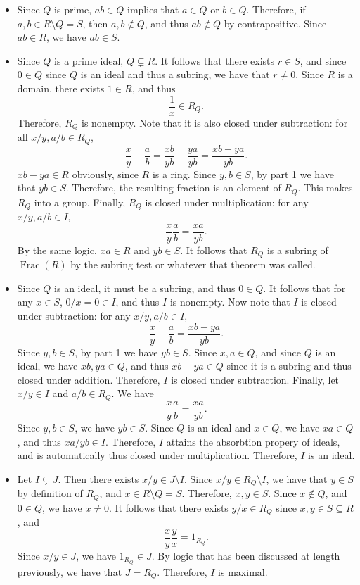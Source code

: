 \documentclass[11pt, letterpaper]{article}
\begin{document}
\begin{itemize}
	\item Since $Q$ is prime, $ab\in Q$ implies that $a\in Q$ or $b\in Q$. Therefore, if $a,b\in R\setminus Q=S$, then $a,b\notin Q$, and thus $ab\notin Q$ by contrapositive. Since $ab\in R$, we have $ab\in S$.
	\item Since $Q$ is a prime ideal, $Q\subsetneq R$. It follows that there exists $r\in S$, and since $0\in Q$ since $Q$ is an ideal and thus a subring, we have that $r\neq 0$. Since $R$ is a domain, there exists $1\in R$, and thus
		\[
			\frac{1}{x} \in R_Q
		.\]
		Therefore, $R_Q$ is nonempty. Note that it is also closed under subtraction: for all $x/y,a/b\in R_Q$,
		\[
			\frac{x}{y} -\frac{a}{b} =\frac{xb}{yb} -\frac{ya}{yb} =\frac{xb-ya}{yb} 
		.\]
		$xb-ya\in R$ obviously, since $R$ is a ring. Since $y,b\in S$, by part 1 we have that $yb\in S$. Therefore, the resulting fraction is an element of $R_Q$. This makes $R_Q$ into a group. Finally, $R_Q$ is closed under multiplication: for any $x/y,a/b\in I$,
		\[
			\frac{x}{y} \frac{a}{b} =\frac{xa}{yb} 
		.\]
		By the same logic, $xa\in R$ and $yb\in S$. It follows that $R_Q$ is a subring of $\operatorname{Frac} (R)$ by the subring test or whatever that theorem was called.
	\item Since $Q$ is an ideal, it must be a subring, and thus $0\in Q$. It follows that for any $x\in S$, $0/x=0\in I$, and thus $I$ is nonempty. Now note that $I$ is closed under subtraction: for any $x/y,a/b\in I$,
		\[
			\frac{x}{y} -\frac{a}{b}=\frac{xb-ya}{yb} 
		.\]
		Since $y,b\in S$, by part 1 we have $yb\in S$. Since $x,a\in Q$, and since $Q$ is an ideal, we have $xb,ya\in Q$, and thus $xb-ya\in Q$ since it is a subring and thus closed under addition. Therefore, $I$ is closed under subtraction. Finally, let $x/y\in I$ and $a/b\in R_Q$. We have
		\[
			\frac{x}{y} \frac{a}{b} =\frac{xa}{yb} 
		.\]
		Since $y,b\in S$, we have $yb\in S$. Since $Q$ is an ideal and $x\in Q$, we have $xa\in Q$, and thus $xa/yb\in I$. Therefore, $I$ attains the absorbtion propery of ideals, and is automatically thus closed under multiplication. Therefore, $I$ is an ideal.
	\item Let $I\subsetneq J$. Then there exists $ x/y\in J\setminus I$. Since $x/y\in R_Q\setminus I$, we have that $y\in S$ by definition of $R_Q$, and $x\in R\setminus Q=S$. Therefore, $x,y\in S$. Since $x\notin Q$, and $0\in Q$, we have $x\neq 0$. It follows that there exists $y/x\in R_Q$ since $x,y\in S\subseteq R$, and
		\[
			\frac{x}{y} \frac{y}{x} =1_{R_Q} 
		.\]
		Since $x/y\in J$, we have $1_{R_Q} \in J$. By logic that has been discussed at length previously, we have that $J=R_Q$. Therefore, $I$ is maximal.
\end{itemize}
\end{document}
